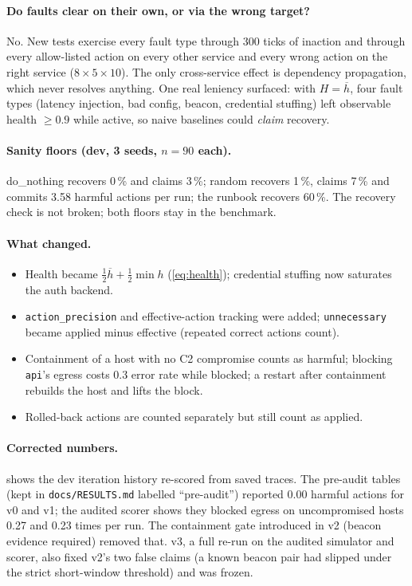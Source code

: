 \documentclass[11pt,a4paper]{article}
\newcommand{\code}[1]{\texttt{#1}}
\newcommand{\pct}[1]{#1\,\%}
\begin{document}
\paragraph{Do faults clear on their own, or via the wrong target?} No. New tests exercise every
fault type through 300 ticks of inaction and through every allow-listed action on every other
service and every wrong action on the right service ($8\times5\times10$). The only cross-service
effect is dependency propagation, which never resolves anything. One real leniency surfaced: with
$H=\overline{h}$, four fault types (latency injection, bad config, beacon, credential stuffing) left
observable health $\ge0.9$ while active, so naive baselines could \emph{claim} recovery.

\paragraph{Sanity floors (dev, 3 seeds, $n=90$ each).} do\_nothing recovers \pct{0} and claims
\pct{3}; random recovers \pct{1}, claims \pct{7} and commits 3.58 harmful actions per run; the
runbook recovers \pct{60}. The recovery check is not broken; both floors stay in the benchmark.

\paragraph{What changed.}
\begin{itemize}
  \item Health became $\tfrac12\overline{h}+\tfrac12\min h$ (\cref{eq:health}); credential stuffing now saturates the auth backend.
  \item \code{action\_precision} and effective-action tracking were added; \code{unnecessary} became applied minus effective (repeated correct actions count).
  \item Containment of a host with no C2 compromise counts as harmful; blocking \code{api}'s egress costs 0.3 error rate while blocked; a restart after containment rebuilds the host and lifts the block.
  \item Rolled-back actions are counted separately but still count as applied.
\end{itemize}

\paragraph{Corrected numbers.}  shows the dev iteration history re-scored from saved
traces. The pre-audit tables (kept in \code{docs/RESULTS.md} labelled ``pre-audit'') reported
0.00 harmful actions for v0 and v1; the audited scorer shows they blocked egress on uncompromised
hosts 0.27 and 0.23 times per run. The containment gate introduced in v2 (beacon evidence required)
removed that. v3, a full re-run on the audited simulator and scorer, also fixed v2's two false
claims (a known beacon pair had slipped under the strict short-window threshold) and was frozen.
\end{document}
